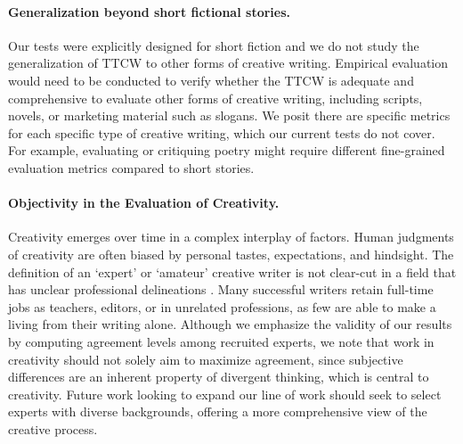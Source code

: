 \paragraph{Generalization beyond short fictional stories.}
Our tests were explicitly designed for short fiction and we do not study the generalization of TTCW to other forms of creative writing. Empirical evaluation would need to be conducted to verify whether the TTCW is adequate and comprehensive to evaluate other forms of creative writing, including scripts, novels, or marketing material such as slogans. We posit there are specific metrics for each specific type of creative writing, which our current tests do not cover. For example, evaluating or critiquing poetry might require different fine-grained evaluation metrics compared to short stories. 

\paragraph{Objectivity in the Evaluation of Creativity.}
Creativity emerges over time in a complex interplay of factors. Human judgments of creativity are often biased by personal tastes, expectations, and hindsight. The definition of an `expert' or `amateur' creative writer is not clear-cut in a field that has unclear professional delineations \cite{gero2023social}. Many successful writers retain full-time jobs as teachers, editors, or in unrelated professions, as few are able to make a living from their writing alone. Although we emphasize the validity of our results by computing agreement levels among recruited experts, we note that work in creativity should not solely aim to maximize agreement, since subjective differences are an inherent property of divergent thinking, which is central to creativity. Future work looking to expand our line of work should seek to select experts with diverse backgrounds, offering a more comprehensive view of the creative process.